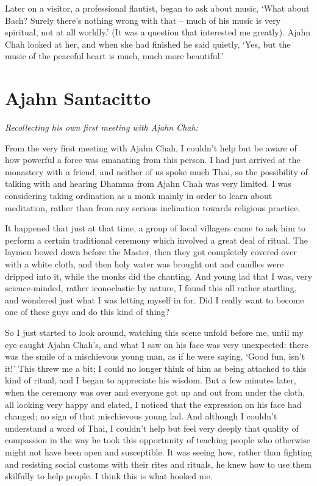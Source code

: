 Later on a visitor, a professional flautist, began to ask about music, 
`What about Bach? Surely there's nothing wrong with that -- much of his
music is very spiritual, not at all worldly.' (It was a question that
interested me greatly). Ajahn Chah looked at her, and when she had
finished he said quietly, `Yes, but the music of the peaceful heart is
much, much more beautiful.'

\section{Ajahn Santacitto}

\emph{Recollecting his own first meeting with Ajahn Chah:}

From the very first meeting with Ajahn Chah, I couldn't help but be
aware of how powerful a force was emanating from this person. I had just
arrived at the monastery with a friend, and neither of us spoke much
Thai, so the possibility of talking with and hearing Dhamma from Ajahn
Chah was very limited. I was considering taking ordination as a monk
mainly in order to learn about meditation, rather than from any serious
inclination towards religious practice. 

It happened that just at that time, a group of local villagers came to
ask him to perform a certain traditional ceremony which involved a great
deal of ritual. The laymen bowed down before the Master, then they got
completely covered over with a white cloth, and then holy water was
brought out and candles were dripped into it, while the monks did the
chanting. And young lad that I was, very science-minded, rather
iconoclastic by nature, I found this all rather startling, and wondered
just what I was letting myself in for. Did I really want to become one
of these guys and do this kind of thing? 

So I just started to look around, watching this scene unfold before me, 
until my eye caught Ajahn Chah's, and what I saw on his face was very
unexpected: there was the smile of a mischievous young man, as if he
were saying, `Good fun, isn't it!' This threw me a bit; I could no
longer think of him as being attached to this kind of ritual, and I
began to appreciate his wisdom. But a few minutes later, when the
ceremony was over and everyone got up and out from under the cloth, all
looking very happy and elated, I noticed that the expression on his face
had changed; no sign of that mischievous young lad. And although I
couldn't understand a word of Thai, I couldn't help but feel very deeply
that quality of compassion in the way he took this opportunity of
teaching people who otherwise might not have been open and susceptible. 
It was seeing how, rather than fighting and resisting social customs
with their rites and rituals, he knew how to use them skilfully to help
people. I think this is what hooked me. 

